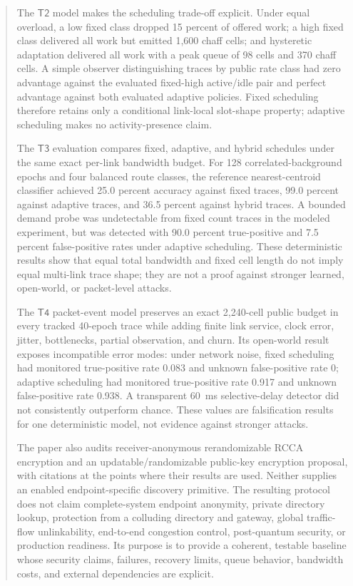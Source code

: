 \documentclass[11pt,oneside]{article}
\newcommand{\Ttwo}{\ensuremath{\mathsf{T2}}}
\newcommand{\Tthree}{\ensuremath{\mathsf{T3}}}
\newcommand{\Tfour}{\ensuremath{\mathsf{T4}}}
\begin{document}
\begin{abstract}
The \Ttwo{} model makes the scheduling trade-off explicit. Under equal overload, a low fixed class dropped 15 percent of offered work; a high fixed class delivered all work but emitted 1,600 chaff cells; and hysteretic adaptation delivered all work with a peak queue of 98 cells and 370 chaff cells. A simple observer distinguishing traces by public rate class had zero advantage against the evaluated fixed-high active/idle pair and perfect advantage against both evaluated adaptive policies. Fixed scheduling therefore retains only a conditional link-local slot-shape property; adaptive scheduling makes no activity-presence claim.

The \Tthree{} evaluation compares fixed, adaptive, and hybrid schedules under the same exact per-link bandwidth budget. For 128 correlated-background epochs and four balanced route classes, the reference nearest-centroid classifier achieved 25.0 percent accuracy against fixed traces, 99.0 percent against adaptive traces, and 36.5 percent against hybrid traces. A bounded demand probe was undetectable from fixed count traces in the modeled experiment, but was detected with 90.0 percent true-positive and 7.5 percent false-positive rates under adaptive scheduling. These deterministic results show that equal total bandwidth and fixed cell length do not imply equal multi-link trace shape; they are not a proof against stronger learned, open-world, or packet-level attacks.

The \Tfour{} packet-event model preserves an exact 2,240-cell public budget in every tracked 40-epoch trace while adding finite link service, clock error, jitter, bottlenecks, partial observation, and churn. Its open-world result exposes incompatible error modes: under network noise, fixed scheduling had monitored true-positive rate 0.083 and unknown false-positive rate 0; adaptive scheduling had monitored true-positive rate 0.917 and unknown false-positive rate 0.938. A transparent 60~ms selective-delay detector did not consistently outperform chance. These values are falsification results for one deterministic model, not evidence against stronger attacks.

The paper also audits receiver-anonymous rerandomizable RCCA encryption and an updatable/randomizable public-key encryption proposal, with citations at the points where their results are used. Neither supplies an enabled endpoint-specific discovery primitive. The resulting protocol does not claim complete-system endpoint anonymity, private directory lookup, protection from a colluding directory and gateway, global traffic-flow unlinkability, end-to-end congestion control, post-quantum security, or production readiness. Its purpose is to provide a coherent, testable baseline whose security claims, failures, recovery limits, queue behavior, bandwidth costs, and external dependencies are explicit.
\end{abstract}
\linenumbers
\modulolinenumbers[5]
\end{document}

